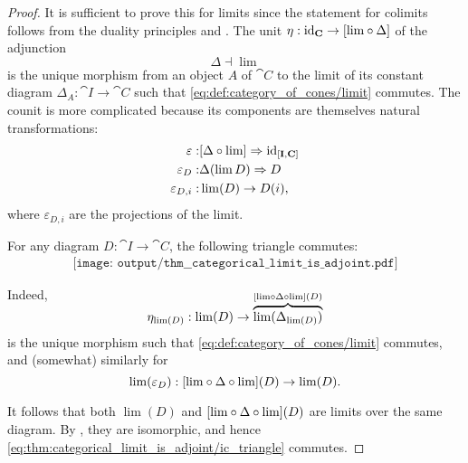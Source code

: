 \begin{proof}
  It is sufficient to prove this for limits since the statement for colimits follows from the duality principles  and . The unit \( \eta: \id_{\cat{C}} \to [{\lim} \bincirc \Delta] \) of the adjunction
  \begin{equation*}
    \Delta \dashv \lim
  \end{equation*}
  is the unique morphism from an object \( A \) of \( \cat{C} \) to the limit of its constant diagram \( \Delta_A: \cat{I} \to \cat{C} \) such that \eqref{eq:def:category_of_cones/limit} commutes. The counit is more complicated because its components are themselves natural transformations:
  \begin{equation*}
    \begin{aligned}
      \varepsilon:       &[\Delta \bincirc \lim] \Rightarrow \id_{[\cat{I}, \cat{C}]} \\
      \varepsilon_D:     &\Delta(\lim D) \Rightarrow D \\
      \varepsilon_{D,i}: &\lim(D) \to D(i),
    \end{aligned}
  \end{equation*}
  where \( \varepsilon_{D,i} \) are the projections of the limit.

  For any diagram \( D: \cat{I} \to \cat{C} \), the following triangle commutes:
  \begin{equation}\label{eq:thm:categorical_limit_is_adjoint/ic_triangle}
    \begin{aligned}
      \texttt{[image: output/thm\_\_categorical\_limit\_is\_adjoint.pdf]}
    \end{aligned}
  \end{equation}

  Indeed,
  \begin{equation*}
    \eta_{\lim(D)}: \lim(D) \to \smash{ \overbrace{\lim(\Delta_{\lim(D)})}^{[{\lim} \bincirc \Delta \bincirc {\lim}](D)} }
  \end{equation*}
  is the unique morphism such that \eqref{eq:def:category_of_cones/limit} commutes, and (somewhat) similarly for
  \begin{equation*}
    \lim(\varepsilon_D): [{\lim} \bincirc \Delta \bincirc {\lim}](D) \to \lim(D).
  \end{equation*}

  It follows that both \( \lim(D) \) and \( [{\lim} \bincirc \Delta \bincirc {\lim}](D) \) are limits over the same diagram. By , they are isomorphic, and hence \eqref{eq:thm:categorical_limit_is_adjoint/ic_triangle} commutes.


\end{proof}
